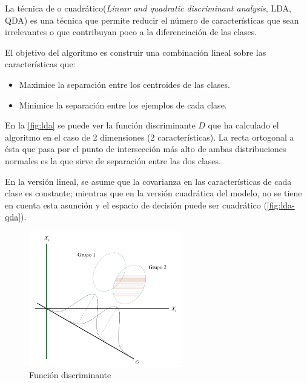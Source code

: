 La técnica de  o cuadrático(\emph{Linear and quadratic discriminant analysis}, LDA, QDA) es una técnica que permite reducir el número de características que sean irrelevantes o que contribuyan poco a la diferenciación de las clases.

El objetivo del algoritmo es construir una combinación lineal sobre las características que:
\begin{itemize}
\item Maximice la separación entre los centroides de las clases.
\item Minimice la separación entre los ejemplos de cada clase.
\end{itemize}

En la \autoref{fig:lda} se puede ver la función discriminante $D$ que ha calculado el algoritmo en el caso de 2 dimensiones (2 características). La recta ortogonal a ésta que pasa por el punto de intersección más alto de ambas distribuciones normales es la que sirve de separación entre las dos clases.

En la versión lineal, se asume que la covarianza en las características de cada clase es constante; mientras que en la versión cuadrática del modelo, no se tiene en cuenta esta asunción y el espacio de decisión puede ser cuadrático (\autoref{fig:lda-qda}).

\begin{figure}[htbp]
\centering
\includegraphics[width=0.6\textwidth]{lda}
\caption[Función discriminante]{Función discriminante \citep{Ruiz2001}}
\label{fig:lda}
\end{figure}

